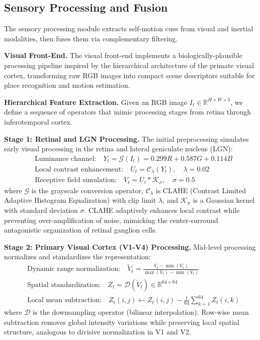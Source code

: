 \subsection{Sensory Processing and Fusion}

The sensory processing module extracts self-motion cues from visual and inertial modalities, then fuses them via complementary filtering.

% 

\textbf{Visual Front-End.} The visual front-end implements a biologically-plausible processing pipeline inspired by the hierarchical architecture of the primate visual cortex, transforming raw RGB images into compact scene descriptors suitable for place recognition and motion estimation.

\textbf{Hierarchical Feature Extraction.} Given an RGB image $I_t\in\mathbb{R}^{H\times W\times 3}$, we define a sequence of operators that mimic processing stages from retina through inferotemporal cortex.

\textbf{Stage 1: Retinal and LGN Processing.} The initial preprocessing simulates early visual processing in the retina and lateral geniculate nucleus (LGN):
\begin{align}
     & \text{Luminance channel:}\quad Y_t = \mathcal{G}(I_t) = 0.299R+0.587G+0.114B              \\
     & \text{Local contrast enhancement:}\quad U_t = \mathcal{C}_\lambda(Y_t),\quad \lambda=0.02 \\
     & \text{Receptive field simulation:}\quad V_t = U_t * \mathcal{K}_\sigma,\quad \sigma=0.5
\end{align}
where $\mathcal{G}$ is the grayscale conversion operator, $\mathcal{C}_\lambda$ is CLAHE (Contrast Limited Adaptive Histogram Equalization) with clip limit $\lambda$, and $\mathcal{K}_\sigma$ is a Gaussian kernel with standard deviation $\sigma$. CLAHE adaptively enhances local contrast while preventing over-amplification of noise, mimicking the center-surround antagonistic organization of retinal ganglion cells.

\textbf{Stage 2: Primary Visual Cortex (V1-V4) Processing.} Mid-level processing normalizes and standardizes the representation:
\begin{align}
     & \text{Dynamic range normalization:}\quad \tilde V_t = \frac{V_t-\min(V_t)}{\max(V_t)-\min(V_t)}     \\
     & \text{Spatial standardization:}\quad Z_t = \mathcal{D}(\tilde V_t)\in\mathbb{R}^{64\times64}        \\
     & \text{Local mean subtraction:}\quad Z_t(i,j)\leftarrow Z_t(i,j)-\frac{1}{64}\sum_{k=1}^{64}Z_t(i,k)
\end{align}
where $\mathcal{D}$ is the downsampling operator (bilinear interpolation). Row-wise mean subtraction removes global intensity variations while preserving local spatial structure, analogous to divisive normalization in V1 and V2.

